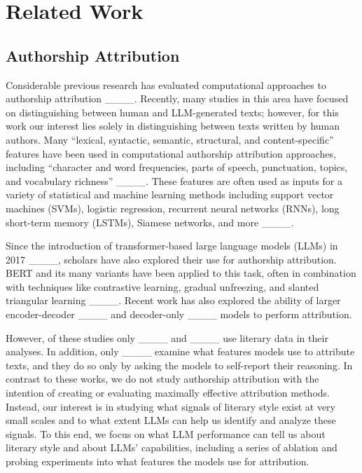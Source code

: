 \section{Related Work}
\subsection{Authorship Attribution}

Considerable previous research has evaluated computational approaches to authorship attribution ____. Recently, many studies in this area have focused on distinguishing between human and LLM-generated texts; however, for this work our interest lies solely in distinguishing between texts written by human authors. Many ``lexical, syntactic, semantic, structural, and content-specific'' features have been used in computational authorship attribution approaches, including ``character and word frequencies, parts of speech, punctuation, topics, and vocabulary richness'' ____. These features are often used as inputs for a variety of statistical and machine learning methods including support vector machines (SVMs), logistic regression, recurrent neural networks (RNNs), long short-term memory (LSTMs), Siamese networks, and more ____. 

Since the introduction of transformer-based large language models (LLMs) in 2017 ____, scholars have also explored their use for authorship attribution. BERT and its many variants have been applied to this task, often in combination with techniques like contrastive learning, gradual unfreezing, and slanted triangular learning ____. Recent work has also explored the ability of larger encoder-decoder ____ and decoder-only ____ models to perform attribution.

However, of these studies only ____ and ____ use literary data in their analyses. In addition, only ____ examine what features models use to attribute texts, and they do so only by asking the models to self-report their reasoning. In contrast to these works, we do not study authorship attribution with the intention of creating or evaluating maximally effective attribution methods. Instead, our interest is in studying what signals of literary style exist at very small scales and to what extent LLMs can help us identify and analyze these signals. To this end, we focus on what LLM performance can tell us about literary style and about LLMs' capabilities, including a series of ablation and probing experiments into what features the models use for attribution.

